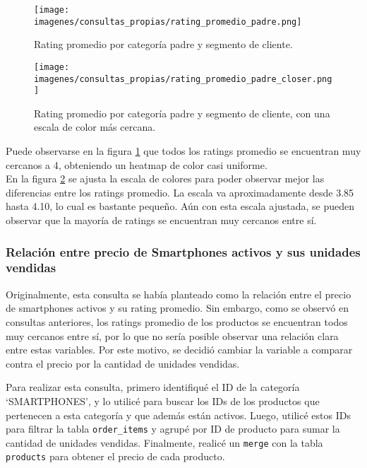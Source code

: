 \begin{figure}[H]
    \centering
    \texttt{[image: imagenes/consultas\_propias/rating\_promedio\_padre.png]}
    \caption{Rating promedio por categoría padre y segmento de cliente.}
    \label{fig:rating_promedio}
\end{figure}
\vspace{-1em}
\begin{figure}[H]
    \centering
    \texttt{[image: imagenes/consultas\_propias/rating\_promedio\_padre\_closer.png]}
    \caption{Rating promedio por categoría padre y segmento de cliente, con una escala de color más cercana.}
    \label{fig:rating_promedio_closer}
\end{figure}
Puede observarse en la figura \ref{fig:rating_promedio} que todos los ratings promedio se encuentran muy cercanos a 4, obteniendo un heatmap de color casi uniforme. \\
En la figura \ref{fig:rating_promedio_closer} se ajusta la escala de colores para poder observar mejor las diferencias entre los ratings promedio. La escala va aproximadamente desde 3.85 hasta 4.10, lo cual es bastante pequeño. Aún con esta escala ajustada, se pueden observar que la mayoría de ratings se encuentran muy cercanos entre sí.

\subsubsection{Relación entre precio de Smartphones activos y sus unidades vendidas}

Originalmente, esta consulta se había planteado como la relación entre el precio de smartphones activos y su rating promedio. Sin embargo, como se observó en consultas anteriores, los ratings promedio de los productos se encuentran todos muy cercanos entre sí, por lo que no sería posible observar una relación clara entre estas variables. Por este motivo, se decidió cambiar la variable a comparar contra el precio por la cantidad de unidades vendidas.

Para realizar esta consulta, primero identifiqué el ID de la categoría `SMARTPHONES', y lo utilicé para buscar los IDs de los productos que pertenecen a esta categoría y que además están activos. Luego, utilicé estos IDs para filtrar la tabla \texttt{order\_items} y agrupé por ID de producto para sumar la cantidad de unidades vendidas. Finalmente, realicé un \texttt{merge} con la tabla \texttt{products} para obtener el precio de cada producto.


